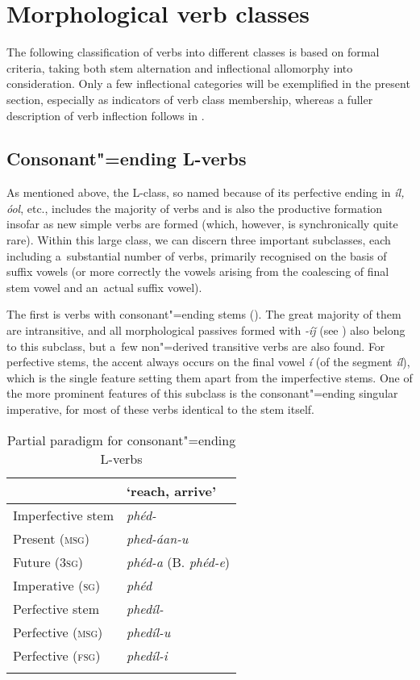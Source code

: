 \section{Morphological verb classes}
\label{sec:8-3}


The following classification of verbs into different classes is based on formal criteria, taking both stem alternation and inflectional allomorphy into consideration. Only a few inflectional categories will be exemplified in the present section, especially as indicators of verb class membership, whereas a fuller description of verb inflection follows in .


\subsection{Consonant"=ending L-verbs}
\label{subsec:8-3-1}


As mentioned above, the L-class, so named because of its perfective ending in \textit{íl, óol}, etc., includes the majority of verbs and is also the productive formation insofar as new simple verbs are formed (which, however, is synchronically quite rare). Within this large class, we can discern three important subclasses, each including a~substantial number of verbs, primarily recognised on the basis of suffix vowels (or more correctly the vowels arising from the coalescing of final stem vowel and an~actual suffix vowel).


The first is verbs with consonant"=ending stems (). The great majority of them are intransitive, and all morphological passives formed with \textit{-íǰ} (see ) also belong to this subclass, but a~few non"=derived transitive verbs are also found. For perfective stems, the accent always occurs on the final vowel \textit{í} (of the segment \textit{íl}), which is the single feature setting them apart from the imperfective stems. One of the more prominent features of this subclass is the consonant"=ending singular imperative, for most of these verbs identical to the stem itself.


\begin{table}[ht]
\caption{Partial paradigm for consonant"=ending L-verbs}
\begin{tabularx}{.75\textwidth}{ Q Q }
\lsptoprule
&
`reach, arrive'\\\hline
Imperfective stem &
\textit{phéd-} \\
Present (\textsc{msg}) &
\textit{phed-áan-u} \\
Future (\textsc{3sg}) &
\textit{phéd-a} (B. \textit{phéd-e}) \\
Imperative (\textsc{sg}) &
\textit{phéd} \\
Perfective stem &
\textit{phedíl-} \\
Perfective (\textsc{msg}) &
\textit{phedíl-u} \\
Perfective (\textsc{fsg}) &
\textit{phedíl-i} \\\lspbottomrule
\end{tabularx}
\label{tab:8-4}
\end{table}


